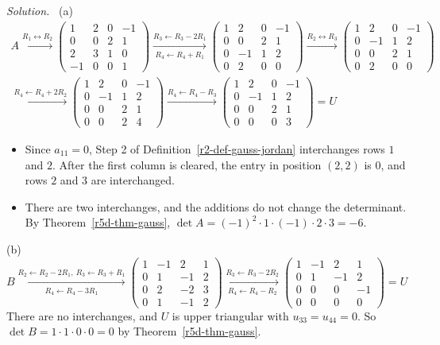 \documentclass[12pt]{article}
\theoremstyle{definition}
\newenvironment{solution}{\par\noindent\textit{Solution.}\ }{\par\smallskip}
\begin{document}
\begin{solution}
(a)
\[
\begin{gathered}
A\xrightarrow{R_1\leftrightarrow R_2}
\begin{pmatrix}1&2&0&-1\\0&0&2&1\\2&3&1&0\\-1&0&0&1\end{pmatrix}
\xrightarrow[R_4\leftarrow R_4+R_1]{R_3\leftarrow R_3-2R_1}
\begin{pmatrix}1&2&0&-1\\0&0&2&1\\0&-1&1&2\\0&2&0&0\end{pmatrix}
\xrightarrow{R_2\leftrightarrow R_3}
\begin{pmatrix}1&2&0&-1\\0&-1&1&2\\0&0&2&1\\0&2&0&0\end{pmatrix}
\\
\xrightarrow{R_4\leftarrow R_4+2R_2}
\begin{pmatrix}1&2&0&-1\\0&-1&1&2\\0&0&2&1\\0&0&2&4\end{pmatrix}
\xrightarrow{R_4\leftarrow R_4-R_3}
\begin{pmatrix}1&2&0&-1\\0&-1&1&2\\0&0&2&1\\0&0&0&3\end{pmatrix}=U
\end{gathered}
\]
\begin{itemize}
\item Since \(a_{11}=0\), Step 2 of Definition~\ref{r2-def-gauss-jordan} interchanges rows \(1\) and \(2\). After the
first column is cleared, the entry in position \((2,2)\) is \(0\), and rows \(2\) and \(3\) are interchanged.
\item There are two interchanges, and the additions do not change the determinant. By Theorem~\ref{r5d-thm-gauss},
\(\det A=(-1)^2\cdot1\cdot(-1)\cdot2\cdot3=-6\).
\end{itemize}

(b)
\[
B\xrightarrow[R_4\leftarrow R_4-3R_1]{R_2\leftarrow R_2-2R_1,\ R_3\leftarrow R_3+R_1}
\begin{pmatrix}1&-1&2&1\\0&1&-1&2\\0&2&-2&3\\0&1&-1&2\end{pmatrix}
\xrightarrow[R_4\leftarrow R_4-R_2]{R_3\leftarrow R_3-2R_2}
\begin{pmatrix}1&-1&2&1\\0&1&-1&2\\0&0&0&-1\\0&0&0&0\end{pmatrix}=U
\]
There are no interchanges, and \(U\) is upper triangular with \(u_{33}=u_{44}=0\). So
\(\det B=1\cdot1\cdot0\cdot0=0\) by Theorem~\ref{r5d-thm-gauss}.


\end{solution}
\end{document}
